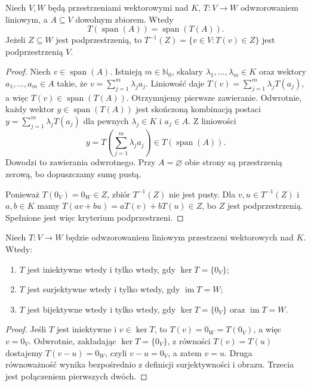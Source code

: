 \begin{stwierdzenie}
\label{prop:lin3-generatory-przeciwobrazy}
Niech \(V,W\) będą przestrzeniami wektorowymi
nad \(K\), \(T\colon V\to W\) odwzorowaniem liniowym,
a \(A\subseteq V\) dowolnym zbiorem.
Wtedy
\[
 T(\operatorname{span}(A))
      =\operatorname{span}(T(A)).
\]
Jeżeli \(Z\subseteq W\) jest podprzestrzenią,
to \(T^{-1}(Z)=\{v\in V:T(v)\in Z\}\)
jest podprzestrzenią \(V\).
\end{stwierdzenie}
\begin{proof}
Niech \(v\in\operatorname{span}(A)\).
Istnieją \(m\in\mathbb N_0\),
skalary \(\lambda_1,\ldots,\lambda_m\in K\)
oraz wektory \(a_1,\ldots,a_m\in A\)
takie, że \(v=\sum_{j=1}^m\lambda_ja_j\).
Liniowość daje
\(T(v)=\sum_{j=1}^m\lambda_jT(a_j)\),
a więc \(T(v)\in\operatorname{span}(T(A))\).
Otrzymujemy pierwsze zawieranie.
Odwrotnie, każdy wektor
\(y\in\operatorname{span}(T(A))\)
jest skończoną kombinacją postaci
\(y=\sum_{j=1}^m\lambda_jT(a_j)\)
dla pewnych \(\lambda_j\in K\) i \(a_j\in A\).
Z liniowości
\[
 y=T\left(\sum_{j=1}^m\lambda_ja_j\right)
 \in T(\operatorname{span}(A)).
\]
Dowodzi to zawierania odwrotnego.
Przy \(A=\varnothing\) obie strony są
przestrzenią zerową, bo dopuszczamy sumę pustą.

Ponieważ \(T(0_V)=0_W\in Z\),
zbiór \(T^{-1}(Z)\) nie jest pusty.
Dla \(v,u\in T^{-1}(Z)\) i \(a,b\in K\)
mamy \(T(av+bu)=aT(v)+bT(u)\in Z\),
bo \(Z\) jest podprzestrzenią.
Spełnione jest więc kryterium podprzestrzeni.
\end{proof}

\begin{twierdzenie}
\label{thm:lin3-iniekcja-surjekcja}
Niech \(T\colon V\to W\) będzie odwzorowaniem
liniowym przestrzeni wektorowych nad \(K\).
Wtedy:
\begin{enumerate}[label=(\roman*)]
\item \(T\) jest iniektywne wtedy i tylko wtedy,
gdy \(\ker T=\{0_V\}\);
\item \(T\) jest surjektywne wtedy i tylko wtedy,
gdy \(\operatorname{im}T=W\);
\item \(T\) jest bijektywne wtedy i tylko wtedy,
gdy \(\ker T=\{0_V\}\) oraz \(\operatorname{im}T=W\).
\end{enumerate}
\end{twierdzenie}
\begin{proof}
Jeśli \(T\) jest iniektywne i \(v\in\ker T\),
to \(T(v)=0_W=T(0_V)\), a więc \(v=0_V\).
Odwrotnie, zakładając \(\ker T=\{0_V\}\),
z równości \(T(v)=T(u)\) dostajemy
\(T(v-u)=0_W\), czyli \(v-u=0_V\),
a zatem \(v=u\). Druga równoważność
wynika bezpośrednio z definicji surjektywności
i obrazu. Trzecia jest połączeniem pierwszych dwóch.
\end{proof}

